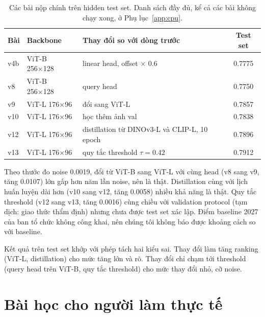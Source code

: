\documentclass[11pt,a4paper]{article}
\begin{document}
\begin{table}[H]
\centering\small
\begin{tabularx}{\linewidth}{@{}llXc@{}}
\toprule
Bài & Backbone & Thay đổi so với dòng trước & Test set \\
\midrule
v4b & ViT-B 256×128 & linear head, offset × 0.6 & 0.7775 \\
v8 & ViT-B 256×128 & query head & 0.7750 \\
v9 & ViT-L 176×96 & đổi sang ViT-L & 0.7857 \\
v10 & ViT-L 176×96 & học thêm ảnh val & 0.7838 \\
v12 & ViT-L 176×96 & distillation từ DINOv3-L và CLIP-L, 10 epoch & 0.7896 \\
v13 & ViT-L 176×96 & quy tắc threshold $\tau=0.42$ & 0.7912 \\
\bottomrule
\end{tabularx}
\caption{Các bài nộp chính trên hidden test set. Danh sách đầy đủ, kể cả các bài không chạy xong, ở Phụ lục~\ref{app:cpu}.}
\label{tab:main}
\end{table}

Theo thước đo noise 0.0019, đổi từ ViT-B sang ViT-L với cùng head (v8 sang v9, tăng 0.0107) lớn gấp hơn năm lần noise, nên là thật. Distillation cùng với lịch huấn luyện dài hơn (v10 sang v12, tăng 0.0058) nhiều khả năng là thật. Quy tắc threshold (v12 sang v13, tăng 0.0016) cùng chiều với validation protocol (tạm dịch: giao thức thẩm định) nhưng chưa được test set xác lập. Điểm baseline 2027 của ban tổ chức không công khai, nên chúng tôi không báo được khoảng cách so với baseline.

Kết quả trên test set khớp với phép tách hai kiểu sai. Thay đổi làm tăng ranking (ViT-L, distillation) cho mức tăng lớn và rõ. Thay đổi chỉ chạm tới threshold (query head trên ViT-B, quy tắc threshold) cho mức thay đổi nhỏ, cỡ noise.

\section{Bài học cho người làm thực tế}
\label{sec:lessons}
\end{document}
